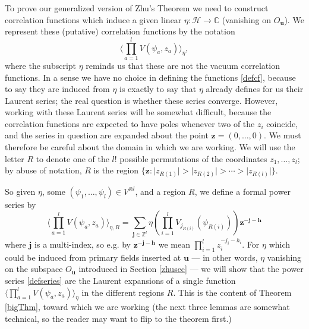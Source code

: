 \documentclass[a4paper,12pt]{article}
\newcommand{\C}{{\mathbb C}}
\newcommand{\Z}{{\mathbb Z}}
\newcommand{\uu}{{\mathbf u}}
\newcommand{\jj}{{\mathbf j}}
\newcommand{\zz}{{\mathbf z}}
\newcommand{\hh}{{\mathbf h}}
\newcommand{\F}{{\mathcal H}}
\newcommand{\abs}[1]{\lvert#1\rvert}
\newcommand{\IP}[1]{\langle#1\rangle}
\begin{document}
To prove our generalized version of Zhu's Theorem we need to construct correlation functions 
which induce a given linear $\eta: \F \to \C$ (vanishing on $O_\uu$).
We represent these (putative) correlation functions by the notation
\begin{equation} \label{defcf}
\IP{\prod_{a=1}^l V(\psi_a, z_a)}_\eta,
\end{equation}
where the subscript $\eta$ reminds us that these are not the
vacuum correlation functions.
In a sense we have no choice in defining the functions \eqref{defcf},
because to say they are induced from $\eta$ is exactly to say that
$\eta$ already defines for us their Laurent series; the real question is whether these series converge.  However, working with these
Laurent series will be somewhat difficult, because the correlation functions are 
expected to have poles whenever two
of the $z_i$ coincide, and the series in question are expanded about the point $\zz = (0, \dots, 0)$.
We must therefore be careful about the domain in which we are working.
We will use the letter $R$ to denote one of the $l!$ 
possible permutations of the coordinates $z_1, \dots, z_l$; by
abuse of notation, $R$ is the region $\{\zz: \abs{z_{R(1)}} > \abs{z_{R(2)}} > \cdots > \abs{z_{R(l)}}\}$.

So given $\eta$, some $(\psi_1, \dots, \psi_l) \in V^{\otimes l}$, and a region $R$, we define a formal power series by
\begin{equation} \label{defseries}
\IP{\prod_{a=1}^l V(\psi_a, z_a)}_{\eta,R} = \sum_{\jj \in \Z^l} \eta \left( \prod_{i=1}^l V_{j_{R(i)}}(\psi_{R(i)}) \right) \zz^{- \jj - \hh}
\end{equation}
where $\jj$ is a multi-index, so e.g. by $\zz^{-\jj-\hh}$ we mean $\prod_{i=1}^l z_i^{-j_i-h_i}$.
For $\eta$ which could be induced from primary fields inserted at $\uu$ --- in other words, $\eta$ vanishing on the
subspace $O_\uu$ introduced in Section \ref{zhusec} --- we will show that the power series \eqref{defseries} 
are the Laurent expansions of a single function 
$\IP{\prod_{a=1}^l V(\psi_a, z_a)}_\eta$ in the different regions $R$.  This is the content of Theorem
\ref{bigThm}, toward which we are working (the next three lemmas are somewhat technical, so the reader may
want to flip to the theorem first.)
\end{document}

